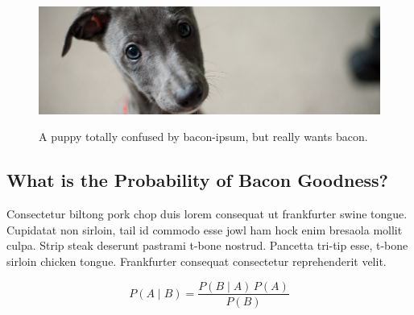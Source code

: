 \documentclass[stu,floatsintext]{apa7}
\begin{document}
\begin{figure}
  \centering
  \caption{A puppy totally confused by bacon-ipsum, but really wants bacon.}
  \includegraphics[width=\textwidth]{dog.jpg}
  \label{fig:my_fig}
\end{figure}

\subsection{What is the Probability of Bacon Goodness?}
Consectetur biltong pork chop duis lorem consequat ut frankfurter swine tongue. Cupidatat non sirloin, tail id commodo esse jowl ham hock enim bresaola mollit culpa. Strip steak deserunt pastrami t-bone nostrud. Pancetta tri-tip esse, t-bone sirloin chicken tongue. Frankfurter consequat consectetur reprehenderit velit.

$$P(A \mid B) = \frac{P(B \mid A) \, P(A)}{P(B)}$$

\printbibliography
\end{document}
